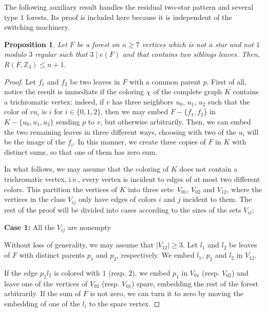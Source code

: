 \documentclass[11pt]{article}
\newtheorem{proposition}[theorem]{Proposition}
\begin{document}
The following auxiliary result handles the residual two-star pattern and several type $1$ forests.  Its proof is included here because it is independent of the switching machinery.

\begin{proposition}\label{prop:siblings-upper}
    Let $F$ be a forest on $n \geq 7$ vertices which is not a star and not $1$ modulo $3$ regular such that $3 \mid e(F)$ and that contains two siblings leaves. Then, $R(F,\mathbb{Z}_3) \leq n+1$. 
\end{proposition}

\begin{proof}
    Let $f_1$ and $f_2$ be two leaves in $F$ with a common parent $p$.
    First of all, notice the result is immediate if the coloring $\chi$ of the complete graph $K$ contains a trichromatic vertex: indeed, if $v$ has three neighbors $u_0$, $u_1$, $u_2$ such that the color of $vu_i$ is $i$ for $i \in \{0,1,2\}$, then we may embed $F-\{f_1,f_2\}$ in $K-\{u_0,u_1,u_2\}$ sending $p$ to $v$, but otherwise arbitrarily. Then, we can embed the two remaining leaves in three different ways, choosing with two of the $u_i$ will be the image of the $f_i$. In this manner, we create three copies of $F$ in $K$ with distinct sums, so that one of them has zero sum.

    In what follows, we may assume that the coloring of $K$ does not contain a trichromatic vertex, i.e., every vertex is incident to edges of at most two different colors. This partition the vertices of $K$ into three sets: $V_{01}$, $V_{02}$ and $V_{12}$, where the vertices in the class $V_{ij}$ only have edges of colors $i$ and $j$ incident to them. The rest of the proof will be divided into cases according to the sizes of the sets $V_{ij}$:

    \textbf{Case 1:} All the $V_{ij}$ are nonempty

    \medskip
    
    Without loss of generality, we may assume that $|V_{12}| \geq 3$. Let $l_1$ and $l_2$ be leaves of $F$ with distinct parents $p_1$ and $p_2$, respectively. We embed $l_1$, $p_2$ and $l_2$ in $V_{12}$.

    If the edge $p_2l_2$ is colored with $1$ (resp. $2$), we embed $p_1$ in $V_{01}$ (resp. $V_{02}$) and leave one of the vertices of $V_{02}$ (resp. $V_{01}$) spare, embedding the rest of the forest arbitrarily. If the sum of $F$ is not zero, we can turn it to zero by moving the embedding of one of the $l_i$ to the spare vertex.


\end{proof}
\end{document}
